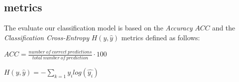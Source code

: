 \subsection{metrics}

The evaluate our classification model is based on the \textit{Accuracy} $ACC$ and the \textit{Classification Cross-Entropy} $H(y, \hat{y})$ metrics defined as follows: 


\begin{center}

	$ACC = \frac{number \ of \ correct \ predictions}{total \ number \ of \ prediction} \cdot 100$ \\

\end{center}


\begin{center}
$H(y, \hat{y})=-\sum_{k=1} y_i log(\hat{y_i})$
\end{center}
	